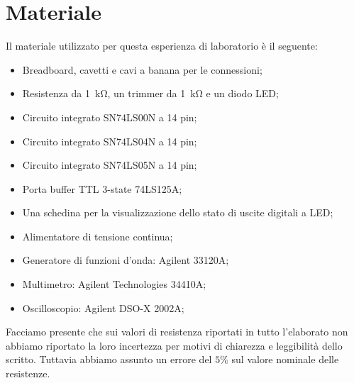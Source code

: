 \section*{Materiale}

Il materiale utilizzato per questa esperienza di laboratorio è il seguente:

\begin{itemize} \itemsep2pt \parskip0pt 
    \item{Breadboard, cavetti e cavi a banana per le connessioni;}
    \item{Resistenza da \SI{1}{\kilo\ohm}, un trimmer da \SI{1}{\kilo\ohm} e un diodo LED;}
    \item{Circuito integrato SN74LS00N a 14 pin;}
    \item{Circuito integrato SN74LS04N a 14 pin;}
	\item{Circuito integrato SN74LS05N a 14 pin;}
	\item{Porta buffer TTL 3-state 74LS125A;}
	\item{Una schedina per la visualizzazione dello stato di uscite digitali a LED;}
    \item{Alimentatore di tensione continua;}
    \item{Generatore di funzioni d'onda: Agilent 33120A;}
    \item{Multimetro: Agilent Technologies 34410A;}
    \item{Oscilloscopio: Agilent DSO-X 2002A;}
\end{itemize}

Facciamo presente che sui valori di resistenza riportati in tutto l'elaborato non abbiamo riportato la loro incertezza per motivi di chiarezza e leggibilità dello scritto. Tuttavia abbiamo assunto un errore del $5\%$ sul valore nominale delle resistenze.
